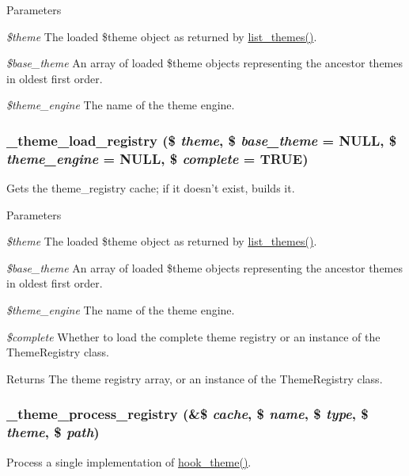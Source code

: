 \begin{DoxyParams}{Parameters}
\item[{\em \$theme}]The loaded \$theme object as returned by \hyperlink{includes_2theme_8inc_a48d5521b10139d745626435d804353a4}{list\_\-themes()}. \item[{\em \$base\_\-theme}]An array of loaded \$theme objects representing the ancestor themes in oldest first order. \item[{\em \$theme\_\-engine}]The name of the theme engine. \end{DoxyParams}
\hypertarget{includes_2theme_8inc_a67aaff43a866a3e65962408f323de8eb}{
\subsubsection[{\_\-theme\_\-load\_\-registry}]{\setlength{\rightskip}{0pt plus 5cm}\_\-theme\_\-load\_\-registry (\$ {\em theme}, \/  \$ {\em base\_\-theme} = {\ttfamily NULL}, \/  \$ {\em theme\_\-engine} = {\ttfamily NULL}, \/  \$ {\em complete} = {\ttfamily TRUE})}}
\label{includes_2theme_8inc_a67aaff43a866a3e65962408f323de8eb}
Gets the theme\_\-registry cache; if it doesn't exist, builds it.


\begin{DoxyParams}{Parameters}
\item[{\em \$theme}]The loaded \$theme object as returned by \hyperlink{includes_2theme_8inc_a48d5521b10139d745626435d804353a4}{list\_\-themes()}. \item[{\em \$base\_\-theme}]An array of loaded \$theme objects representing the ancestor themes in oldest first order. \item[{\em \$theme\_\-engine}]The name of the theme engine. \item[{\em \$complete}]Whether to load the complete theme registry or an instance of the ThemeRegistry class.\end{DoxyParams}
\begin{DoxyReturn}{Returns}
The theme registry array, or an instance of the ThemeRegistry class. 
\end{DoxyReturn}
\hypertarget{includes_2theme_8inc_a473fae348447b091f0d8e677820d30c3}{
\subsubsection[{\_\-theme\_\-process\_\-registry}]{\setlength{\rightskip}{0pt plus 5cm}\_\-theme\_\-process\_\-registry (\&\$ {\em cache}, \/  \$ {\em name}, \/  \$ {\em type}, \/  \$ {\em theme}, \/  \$ {\em path})}}
\label{includes_2theme_8inc_a473fae348447b091f0d8e677820d30c3}
Process a single implementation of \hyperlink{group__hooks_ga013ccb45c7aaab1c16cf9691428c910d}{hook\_\-theme()}.


